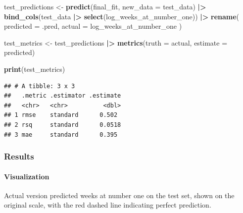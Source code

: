 \documentclass[
]{article}
\newenvironment{Shaded}{\begin{snugshade}}{\end{snugshade}}
\newcommand{\AttributeTok}[1]{\textcolor[rgb]{0.13,0.29,0.53}{#1}}
\newcommand{\FunctionTok}[1]{\textcolor[rgb]{0.13,0.29,0.53}{\textbf{#1}}}
\newcommand{\NormalTok}[1]{#1}
\newcommand{\OtherTok}[1]{\textcolor[rgb]{0.56,0.35,0.01}{#1}}
\newcommand{\SpecialCharTok}[1]{\textcolor[rgb]{0.81,0.36,0.00}{\textbf{#1}}}
\begin{document}
\begin{Shaded}
\begin{Highlighting}[]
\NormalTok{test\_predictions }\OtherTok{\textless{}{-}} \FunctionTok{predict}\NormalTok{(final\_fit, }\AttributeTok{new\_data =}\NormalTok{ test\_data) }\SpecialCharTok{|\textgreater{}}
  \FunctionTok{bind\_cols}\NormalTok{(test\_data }\SpecialCharTok{|\textgreater{}} \FunctionTok{select}\NormalTok{(log\_weeks\_at\_number\_one)) }\SpecialCharTok{|\textgreater{}}
  \FunctionTok{rename}\NormalTok{(}
    \AttributeTok{predicted =}\NormalTok{ .pred,}
    \AttributeTok{actual    =}\NormalTok{ log\_weeks\_at\_number\_one}
\NormalTok{  )}

\NormalTok{test\_metrics }\OtherTok{\textless{}{-}}\NormalTok{ test\_predictions }\SpecialCharTok{|\textgreater{}}
  \FunctionTok{metrics}\NormalTok{(}\AttributeTok{truth =}\NormalTok{ actual, }\AttributeTok{estimate =}\NormalTok{ predicted)}

\FunctionTok{print}\NormalTok{(test\_metrics)}
\end{Highlighting}
\end{Shaded}

\begin{verbatim}
## # A tibble: 3 x 3
##   .metric .estimator .estimate
##   <chr>   <chr>          <dbl>
## 1 rmse    standard      0.502 
## 2 rsq     standard      0.0518
## 3 mae     standard      0.395
\end{verbatim}

\subsubsection{Results}\label{results}

\paragraph{Visualization}\label{visualization}

Actual version predicted weeks at number one on the test set, shown on
the original scale, with the red dashed line indicating perfect
prediction.
\end{document}
